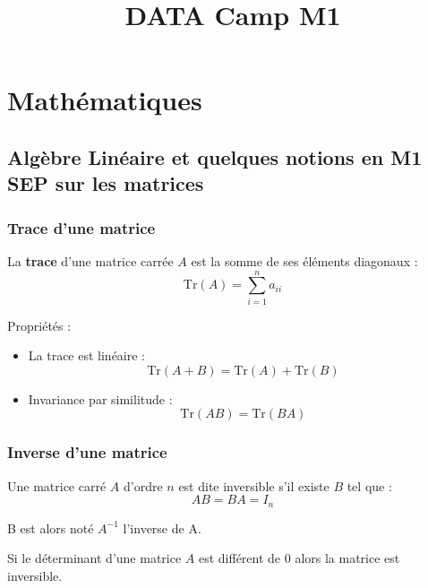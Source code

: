 \documentclass[
  letterpaper,
  DIV=11,
  numbers=noendperiod]{scrartcl}
\title{DATA Camp M1}
\author{}
\date{}
\providecommand{\tightlist}{%
  \setlength{\itemsep}{0pt}\setlength{\parskip}{0pt}}\usepackage{longtable,booktabs,array}
\begin{document}
\maketitle


\section{Mathématiques}\label{mathuxe9matiques}

\subsection{Algèbre Linéaire et quelques notions en M1 SEP sur les
matrices}\label{alguxe8bre-linuxe9aire-et-quelques-notions-en-m1-sep-sur-les-matrices}

\subsubsection{Trace d'une matrice}\label{trace-dune-matrice}

La \textbf{trace} d'une matrice carrée \(A\) est la somme de ses
éléments diagonaux : \[\text{Tr}(A) = \sum_{i=1}^{n} a_{ii}\]

Propriétés :

\begin{itemize}
\tightlist
\item
  La trace est linéaire :
  \[\text{Tr}(A + B) = \text{Tr}(A) + \text{Tr}(B)\]
\item
  Invariance par similitude : \[\text{Tr}(AB) = \text{Tr}(BA)\]
\end{itemize}

\subsubsection{Inverse d'une matrice}\label{inverse-dune-matrice}

Une matrice carré \(A\) d'ordre \(n\) est dite inversible s'il existe
\(B\) tel que : \[AB = BA = I_n\]

B est alors noté \(A^{-1}\) l'inverse de A.

\begin{tcolorbox}[enhanced jigsaw, rightrule=.15mm, bottomrule=.15mm, opacitybacktitle=0.6, leftrule=.75mm, colbacktitle=quarto-callout-tip-color!10!white, colback=white, opacityback=0, toprule=.15mm, left=2mm, title=\textcolor{quarto-callout-tip-color}{\faLightbulb}\hspace{0.5em}{Tip}, breakable, bottomtitle=1mm, colframe=quarto-callout-tip-color-frame, toptitle=1mm, titlerule=0mm, coltitle=black, arc=.35mm]

Si le déterminant d'une matrice \(A\) est différent de 0 alors la
matrice est inversible.

\end{tcolorbox}
\end{document}
